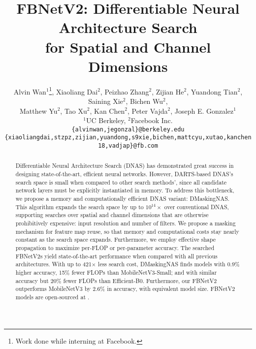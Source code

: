 \documentclass[10pt,twocolumn,letterpaper]{article}
\begin{document}
\title{FBNetV2: Differentiable Neural Architecture Search \\for Spatial and Channel Dimensions} 
\author{
Alvin Wan$^{1}$\thanks{Work done while interning at Facebook.}, Xiaoliang Dai$^{2}$, Peizhao Zhang$^{2}$, Zijian He$^{2}$, Yuandong Tian$^{2}$, Saining Xie$^{2}$, Bichen Wu$^{2}$, \\
Matthew Yu$^{2}$, Tao Xu$^{2}$, Kan Chen$^{2}$, Peter Vajda$^{2}$, Joseph E. Gonzalez$^{1}$\\
$^{1}$UC Berkeley, $^{2}$Facebook Inc.\\
{\tt\small \{alvinwan,jegonzal\}@berkeley.edu}\\
{\tt\small \{xiaoliangdai,stzpz,zijian,yuandong,s9xie,bichen,mattcyu,xutao,kanchen18,vadjap\}@fb.com}
}

\maketitle




\begin{abstract}
Differentiable Neural Architecture Search (DNAS) has demonstrated great success in designing state-of-the-art, efficient neural networks. However, DARTS-based DNAS's search space is small when compared to other search methods', since all candidate network layers must be explicitly instantiated in memory. To address this bottleneck, we propose a memory and computationally efficient DNAS variant: DMaskingNAS.  This algorithm expands the search space by up to $10^{14}\times$ over conventional DNAS, supporting searches over spatial and channel dimensions that are otherwise prohibitively expensive: input resolution and number of filters. We propose a masking mechanism for feature map reuse, so that memory and computational costs stay nearly constant as the search space expands. Furthermore, we employ  effective shape propagation to maximize per-FLOP or per-parameter accuracy. The searched FBNetV2s yield state-of-the-art performance when compared with all previous architectures.
With up to 421$\times$ less search cost, DMaskingNAS finds models with 0.9\% higher accuracy, 15\% fewer FLOPs than MobileNetV3-Small; and with similar accuracy but 20\% fewer FLOPs than Efficient-B0. Furthermore, our FBNetV2 outperforms MobileNetV3 by 2.6\% in accuracy, with equivalent model size. FBNetV2 models are open-sourced at \hyperlink{https://github.com/facebookresearch/mobile-vision}{\color{blue}{https://github.com/facebookresearch/mobile-vision}}.



\vspace{-0.2in}



\end{abstract}
\end{document}
